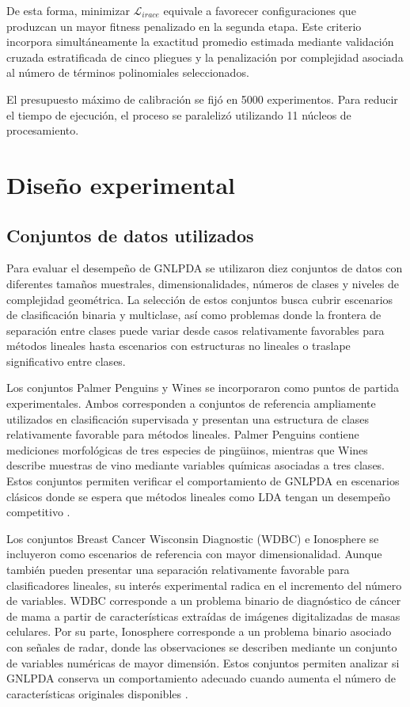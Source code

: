 De esta forma, minimizar $\mathcal{L}_{irace}$ equivale a favorecer configuraciones que produzcan un mayor fitness penalizado en la segunda etapa. Este criterio incorpora simultáneamente la exactitud promedio estimada mediante validación cruzada estratificada de cinco pliegues y la penalización por complejidad asociada al número de términos polinomiales seleccionados.

El presupuesto máximo de calibración se fijó en 5000 experimentos. Para reducir el tiempo de ejecución, el proceso se paralelizó utilizando 11 núcleos de procesamiento.

\section{Diseño experimental}

\subsection{Conjuntos de datos utilizados}

Para evaluar el desempeño de GNLPDA se utilizaron diez conjuntos de datos con diferentes tamaños muestrales, dimensionalidades, números de clases y niveles de complejidad geométrica. La selección de estos conjuntos busca cubrir escenarios de clasificación binaria y multiclase, así como problemas donde la frontera de separación entre clases puede variar desde casos relativamente favorables para métodos lineales hasta escenarios con estructuras no lineales o traslape significativo entre clases.

Los conjuntos Palmer Penguins y Wines se incorporaron como puntos de partida
experimentales. Ambos corresponden a conjuntos de referencia ampliamente utilizados en clasificación supervisada y presentan una estructura de clases relativamente favorable para métodos lineales. Palmer Penguins contiene mediciones morfológicas de tres especies de pingüinos, mientras que Wines describe muestras de vino mediante variables químicas asociadas a tres clases. Estos conjuntos permiten verificar el comportamiento de GNLPDA en escenarios clásicos donde se espera que métodos lineales como LDA tengan un desempeño competitivo \cite{horst2022palmer}\cite{barth2021classification}.

Los conjuntos Breast Cancer Wisconsin Diagnostic (WDBC) e Ionosphere se incluyeron como escenarios de referencia con mayor dimensionalidad. Aunque también pueden presentar una separación relativamente favorable para clasificadores lineales, su interés experimental radica en el incremento del número de variables. WDBC corresponde a un problema binario de diagnóstico de cáncer de mama a partir de características extraídas de imágenes digitalizadas de masas celulares. Por su parte, Ionosphere corresponde a un problema binario asociado con señales de radar, donde las observaciones se describen mediante un conjunto de variables numéricas de mayor dimensión. Estos conjuntos permiten analizar si GNLPDA conserva un comportamiento adecuado cuando aumenta el número de características originales disponibles \cite{salama2012breast} \cite{sigillito1989classification}.


